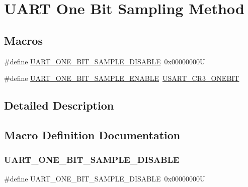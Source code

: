 \hypertarget{group___u_a_r_t___one_bit___sampling}{}\section{U\+A\+RT One Bit Sampling Method}
\label{group___u_a_r_t___one_bit___sampling}
\subsection*{Macros}
\begin{DoxyCompactItemize}
\item 
\#define \mbox{\hyperlink{group___u_a_r_t___one_bit___sampling_gadfcb0e9db2719321048b249b2c5cc15f}{U\+A\+R\+T\+\_\+\+O\+N\+E\+\_\+\+B\+I\+T\+\_\+\+S\+A\+M\+P\+L\+E\+\_\+\+D\+I\+S\+A\+B\+LE}}~0x00000000U
\item 
\#define \mbox{\hyperlink{group___u_a_r_t___one_bit___sampling_gadcc0aed6e7a466da3c45363f69dcbfb6}{U\+A\+R\+T\+\_\+\+O\+N\+E\+\_\+\+B\+I\+T\+\_\+\+S\+A\+M\+P\+L\+E\+\_\+\+E\+N\+A\+B\+LE}}~\mbox{\hyperlink{group___peripheral___registers___bits___definition_ga9a96fb1a7beab602cbc8cb0393593826}{U\+S\+A\+R\+T\+\_\+\+C\+R3\+\_\+\+O\+N\+E\+B\+IT}}
\end{DoxyCompactItemize}


\subsection{Detailed Description}


\subsection{Macro Definition Documentation}
\mbox{\label{group___u_a_r_t___one_bit___sampling_gadfcb0e9db2719321048b249b2c5cc15f}} 
\subsubsection{\texorpdfstring{UART\_ONE\_BIT\_SAMPLE\_DISABLE}{UART\_ONE\_BIT\_SAMPLE\_DISABLE}}
{\footnotesize\ttfamily \#define U\+A\+R\+T\+\_\+\+O\+N\+E\+\_\+\+B\+I\+T\+\_\+\+S\+A\+M\+P\+L\+E\+\_\+\+D\+I\+S\+A\+B\+LE~0x00000000U}


